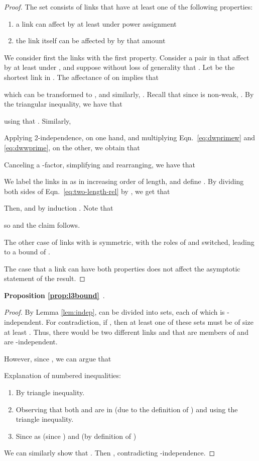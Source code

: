 \documentclass[11pt]{amsart}
\begin{document}
\begin{proof}
The set  consists of links that have at least one of the following properties:
\begin{enumerate}
\item a link can affect  by at least  under power assignment 
\item the link itself can be affected by  by that amount
\end{enumerate}
We consider first the links with the first property. Consider a pair  in  that affect  by at least  under , 
and suppose without loss of generality that .
Let  be the shortest link in .
The affectance of  on  implies that

which can be transformed to 
, 
and similarly, .
Recall that since  is non-weak, .
By the triangular inequality, we have that 

using that .
Similarly, 

Applying 2-independence, on one hand, and multiplying Eqn.\ \ref{eq:dwprimew} and \ref{eq:dwwprime}, on the other, we obtain that

Canceling a -factor, simplifying and rearranging,
we have that

We label the links in  as  in 
increasing order of length, and define .
By dividing both sides of Eqn.\ \ref{eq:two-length-rel} by , 
we get that

Then,  and 
by induction .
Note that 

 so
 and the claim follows.

The other case of links  with 
is symmetric, with the roles of  and  switched, leading to a bound of . 

The case that a link can have both properties does not affect the asymptotic statement of the result.
\end{proof}


\medskip

\noindent \textbf{Proposition \ref{prop:l3bound}}\ 
.
\smallskip

\begin{proof}
By Lemma \ref{lem:indep},  can be divided into  sets, each of which is -independent.  For
contradiction, if , then at least one
of these sets must be of size at least .  Thus, there would be two
different links  and  that are members of  and
are -independent.

However, since , we can argue that 

Explanation of numbered inequalities:
\begin{enumerate}
\item By triangle inequality.
\item Observing that both   and  are in  (due to the definition of ) and using the triangle inequality.
\item Since  as  (since ) and  (by definition of )
\end{enumerate}

We can similarly show that . Then , contradicting -independence.
\end{proof}
\end{document}
